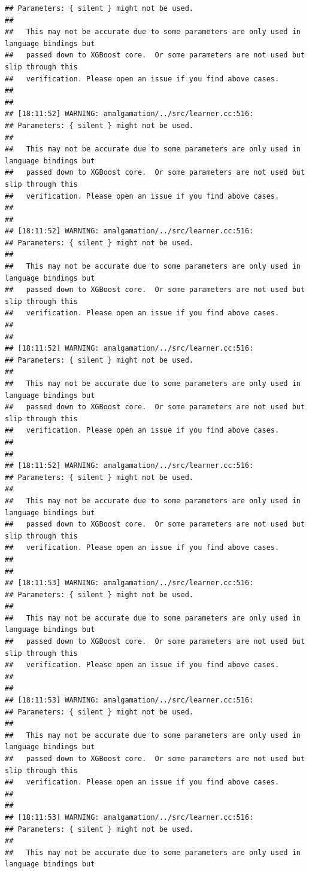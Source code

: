 \documentclass[AMS,STIX2COL]{WileyNJD-v2}\usepackage[]{graphicx}\usepackage[]{color}
\makeatletter
\newenvironment{kframe}{%
 \def\at@end@of@kframe{}%
 \ifinner\ifhmode%
  \def\at@end@of@kframe{\end{minipage}}%
  \begin{minipage}{\columnwidth}%
 \fi\fi%
 \def\FrameCommand##1{\hskip\@totalleftmargin \hskip-\fboxsep
 \colorbox{shadecolor}{##1}\hskip-\fboxsep
     \hskip-\linewidth \hskip-\@totalleftmargin \hskip\columnwidth}%
 \MakeFramed {\advance\hsize-\width
   \@totalleftmargin\z@ \linewidth\hsize
   \@setminipage}}%
 {\par\unskip\endMakeFramed%
 \at@end@of@kframe}
\newenvironment{knitrout}{}{} %
\makeatother
\begin{document}
\begin{knitrout}
\begin{kframe}
\begin{verbatim}
## Parameters: { silent } might not be used.
## 
##   This may not be accurate due to some parameters are only used in language bindings but
##   passed down to XGBoost core.  Or some parameters are not used but slip through this
##   verification. Please open an issue if you find above cases.
## 
## 
## [18:11:52] WARNING: amalgamation/../src/learner.cc:516: 
## Parameters: { silent } might not be used.
## 
##   This may not be accurate due to some parameters are only used in language bindings but
##   passed down to XGBoost core.  Or some parameters are not used but slip through this
##   verification. Please open an issue if you find above cases.
## 
## 
## [18:11:52] WARNING: amalgamation/../src/learner.cc:516: 
## Parameters: { silent } might not be used.
## 
##   This may not be accurate due to some parameters are only used in language bindings but
##   passed down to XGBoost core.  Or some parameters are not used but slip through this
##   verification. Please open an issue if you find above cases.
## 
## 
## [18:11:52] WARNING: amalgamation/../src/learner.cc:516: 
## Parameters: { silent } might not be used.
## 
##   This may not be accurate due to some parameters are only used in language bindings but
##   passed down to XGBoost core.  Or some parameters are not used but slip through this
##   verification. Please open an issue if you find above cases.
## 
## 
## [18:11:52] WARNING: amalgamation/../src/learner.cc:516: 
## Parameters: { silent } might not be used.
## 
##   This may not be accurate due to some parameters are only used in language bindings but
##   passed down to XGBoost core.  Or some parameters are not used but slip through this
##   verification. Please open an issue if you find above cases.
## 
## 
## [18:11:53] WARNING: amalgamation/../src/learner.cc:516: 
## Parameters: { silent } might not be used.
## 
##   This may not be accurate due to some parameters are only used in language bindings but
##   passed down to XGBoost core.  Or some parameters are not used but slip through this
##   verification. Please open an issue if you find above cases.
## 
## 
## [18:11:53] WARNING: amalgamation/../src/learner.cc:516: 
## Parameters: { silent } might not be used.
## 
##   This may not be accurate due to some parameters are only used in language bindings but
##   passed down to XGBoost core.  Or some parameters are not used but slip through this
##   verification. Please open an issue if you find above cases.
## 
## 
## [18:11:53] WARNING: amalgamation/../src/learner.cc:516: 
## Parameters: { silent } might not be used.
## 
##   This may not be accurate due to some parameters are only used in language bindings but

\end{verbatim}
\end{kframe}
\end{knitrout}
\end{document}
